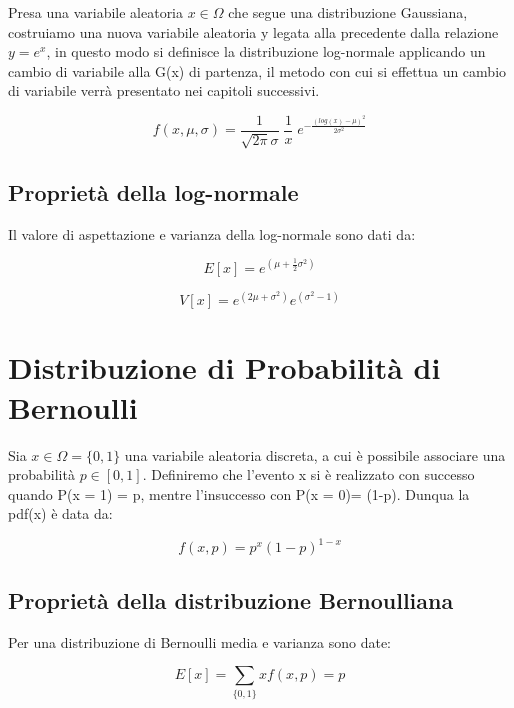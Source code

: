 \documentclass[11pt,a4paper]{book}
\begin{document}
Presa una variabile aleatoria $x \in \Omega $ che segue una distribuzione Gaussiana, costruiamo una nuova variabile aleatoria y legata alla precedente dalla relazione $y = e^x$, in questo modo si definisce la distribuzione log-normale applicando un cambio di variabile alla G(x) di partenza, il metodo con cui si effettua un cambio di variabile verr\`{a} presentato nei capitoli successivi.

\begin{equation*}
	f(x,\mu,\sigma) = \dfrac{1}{\sqrt{2\pi}\sigma}\;\dfrac{1}{x}\; e^{-\frac{(log(x)-\mu)^2}{2\sigma^2}}
\end{equation*} 

\subsection{Propriet\`{a} della log-normale}

Il valore di aspettazione e varianza della log-normale sono dati da:

\begin{equation}
	E[x] = e^{(\mu + \frac{1}{2}\sigma^2)}
\end{equation}

\begin{equation}
	V[x] = e^{(2\mu + \sigma^2)}e^{(\sigma^2-1)}
\end{equation}

\section{Distribuzione di Probabilit\`{a} di Bernoulli}

Sia $x \in \Omega = \{0,1\}$ una variabile aleatoria discreta, a cui \`{e} possibile associare una probabilit\`{a} $p \in [0,1]$. Definiremo che l'evento x si \`{e} realizzato con successo quando P(x = 1) = p, mentre l'insuccesso con P(x = 0)= (1-p). Dunqua la pdf(x) \`{e} data da:

\begin{equation*}
	f(x,p) = p^x(1-p)^{1-x}
\end{equation*}

\subsection{Propriet\`{a} della distribuzione Bernoulliana}

Per una distribuzione di Bernoulli media e varianza sono date:

\begin{equation}
	E[x] = \sum_{\{0,1\}}xf(x,p) = p
\end{equation}
\end{document}
